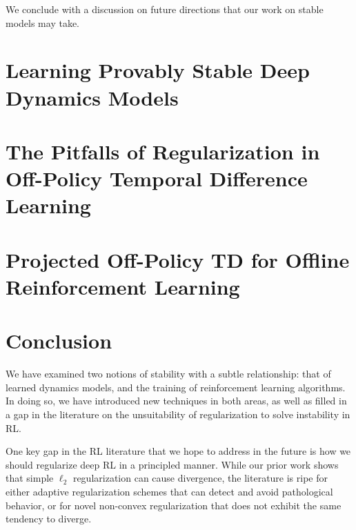 \documentclass[11pt]{book}
\begin{document}
We conclude with a discussion on future directions that our work on stable models may take.


\mainmatter
\chapter[Learning Stable Dynamics Models]{Learning Provably Stable Deep Dynamics Models}



\chapter[The Pitfalls of Regularization in Off-Policy TD]{The Pitfalls of Regularization in Off-Policy Temporal Difference Learning}



\chapter{Projected Off-Policy TD for Offline Reinforcement Learning}




\chapter{Conclusion}

We have examined two notions of stability with a subtle relationship: that of learned dynamics models, and the training of reinforcement learning algorithms. In doing so, we have introduced new techniques in both areas, as well as filled in a gap in the literature on the unsuitability of regularization to solve instability in RL.

One key gap in the RL literature that we hope to address in the future is how we should regularize deep RL in a principled manner. While our prior work shows that simple $\ell_2$ regularization can cause divergence, the literature is ripe for either adaptive regularization schemes that can detect and avoid pathological behavior, or for novel non-convex regularization that does not exhibit the same tendency to diverge.
\end{document}
